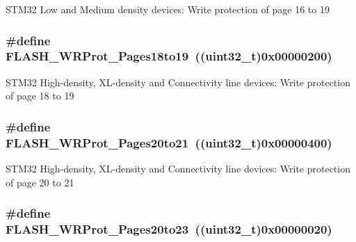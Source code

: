 STM32 Low and Medium density devices: Write protection of page 16 to 19 \hypertarget{group__Option__Bytes__Write__Protection_ga856fdcf3d41edc73902fcf93a1e375d9}{
\subsubsection[{FLASH\_\-WRProt\_\-Pages18to19}]{\setlength{\rightskip}{0pt plus 5cm}\#define FLASH\_\-WRProt\_\-Pages18to19~((uint32\_\-t)0x00000200)}}
\label{group__Option__Bytes__Write__Protection_ga856fdcf3d41edc73902fcf93a1e375d9}
STM32 High-\/density, XL-\/density and Connectivity line devices: Write protection of page 18 to 19 \hypertarget{group__Option__Bytes__Write__Protection_ga09215d5d245c8f5cd664c5cc4ff9fb69}{
\subsubsection[{FLASH\_\-WRProt\_\-Pages20to21}]{\setlength{\rightskip}{0pt plus 5cm}\#define FLASH\_\-WRProt\_\-Pages20to21~((uint32\_\-t)0x00000400)}}
\label{group__Option__Bytes__Write__Protection_ga09215d5d245c8f5cd664c5cc4ff9fb69}
STM32 High-\/density, XL-\/density and Connectivity line devices: Write protection of page 20 to 21 \hypertarget{group__Option__Bytes__Write__Protection_ga537e0f85899e13ca2ed93455e537d950}{
\subsubsection[{FLASH\_\-WRProt\_\-Pages20to23}]{\setlength{\rightskip}{0pt plus 5cm}\#define FLASH\_\-WRProt\_\-Pages20to23~((uint32\_\-t)0x00000020)}}
\label{group__Option__Bytes__Write__Protection_ga537e0f85899e13ca2ed93455e537d950}
